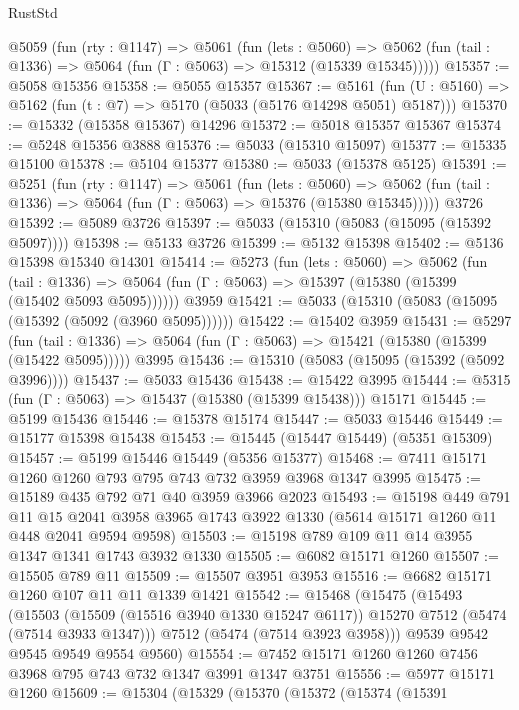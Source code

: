 \begin{lexlean}{RustStd}
\begin{coremodule}
  @5059
    (fun (rty : @1147) =>
    @5061
      (fun (lets : @5060) =>
      @5062 (fun (tail : @1336) => @5064 (fun (Γ : @5063) => @15312 (@15339 @15345)))))
@15357 := @5058 @15356
@15358 := @5055 @15357
@15367 := @5161
    (fun (U : @5160) => @5162 (fun (t : @7) => @5170 (@5033 (@5176 @14298 @5051) @5187)))
@15370 := @15332 (@15358 @15367) @14296
@15372 := @5018 @15357 @15367
@15374 := @5248 @15356 @3888
@15376 := @5033 (@15310 @15097)
@15377 := @15335 @15100
@15378 := @5104 @15377
@15380 := @5033 (@15378 @5125)
@15391 := @5251
    (fun (rty : @1147) =>
    @5061
      (fun (lets : @5060) =>
      @5062 (fun (tail : @1336) => @5064 (fun (Γ : @5063) => @15376 (@15380 @15345)))))
    @3726
@15392 := @5089 @3726
@15397 := @5033 (@15310 (@5083 (@15095 (@15392 @5097))))
@15398 := @5133 @3726
@15399 := @5132 @15398
@15402 := @5136 @15398 @15340 @14301
@15414 := @5273
    (fun (lets : @5060) =>
    @5062
      (fun (tail : @1336) =>
      @5064 (fun (Γ : @5063) => @15397 (@15380 (@15399 (@15402 @5093 @5095))))))
    @3959
@15421 := @5033 (@15310 (@5083 (@15095 (@15392 (@5092 (@3960 @5095))))))
@15422 := @15402 @3959
@15431 := @5297
    (fun (tail : @1336) => @5064 (fun (Γ : @5063) => @15421 (@15380 (@15399 (@15422 @5095)))))
    @3995
@15436 := @15310 (@5083 (@15095 (@15392 (@5092 @3996))))
@15437 := @5033 @15436
@15438 := @15422 @3995
@15444 := @5315 (fun (Γ : @5063) => @15437 (@15380 (@15399 @15438))) @15171
@15445 := @5199 @15436
@15446 := @15378 @15174
@15447 := @5033 @15446
@15449 := @15177 @15398 @15438
@15453 := @15445 (@15447 @15449) (@5351 @15309)
@15457 := @5199 @15446 @15449 (@5356 @15377)
@15468 := @7411 @15171 @1260 @1260 @793 @795 @743 @732 @3959 @3968 @1347 @3995
@15475 := @15189 @435 @792 @71 @40 @3959 @3966 @2023
@15493 := @15198
    @449
    @791
    @11
    @15
    @2041
    @3958
    @3965
    @1743
    @3922
    @1330
    (@5614 @15171 @1260 @11 @448 @2041 @9594 @9598)
@15503 := @15198 @789 @109 @11 @14 @3955 @1347 @1341 @1743 @3932 @1330
@15505 := @6082 @15171 @1260
@15507 := @15505 @789 @11
@15509 := @15507 @3951 @3953
@15516 := @6682 @15171 @1260 @107 @11 @11 @1339 @1421
@15542 := @15468
    (@15475
      (@15493
        (@15503 (@15509 (@15516 @3940 @1330 @15247 @6117)) @15270 @7512 (@5474 (@7514 @3933 @1347)))
        @7512
        (@5474 (@7514 @3923 @3958)))
      @9539
      @9542
      @9545
      @9549
      @9554
      @9560)
@15554 := @7452 @15171 @1260 @1260 @7456 @3968 @795 @743 @732 @1347 @3991 @1347 @3751
@15556 := @5977 @15171 @1260
@15609 := @15304
    (@15329
      (@15370
        (@15372
          (@15374
            (@15391

\end{coremodule}
\end{lexlean}
